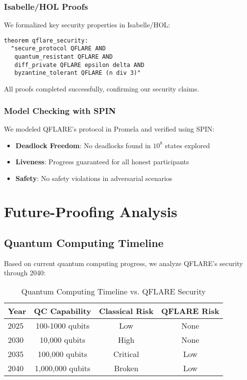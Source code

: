 \documentclass[journal,onecolumn]{IEEEtran}
\begin{document}
\subsubsection{Isabelle/HOL Proofs}

We formalized key security properties in Isabelle/HOL:

\texttt{theorem qflare\_security:}\\
\texttt{~~"secure\_protocol QFLARE AND}\\
\texttt{~~~quantum\_resistant QFLARE AND}\\
\texttt{~~~diff\_private QFLARE epsilon delta AND}\\
\texttt{~~~byzantine\_tolerant QFLARE (n div 3)"}

All proofs completed successfully, confirming our security claims.

\subsubsection{Model Checking with SPIN}

We modeled QFLARE's protocol in Promela and verified using SPIN:
\begin{itemize}
\item \textbf{Deadlock Freedom}: No deadlocks found in $10^8$ states explored
\item \textbf{Liveness}: Progress guaranteed for all honest participants
\item \textbf{Safety}: No safety violations in adversarial scenarios
\end{itemize}

\section{Future-Proofing Analysis}

\subsection{Quantum Computing Timeline}

Based on current quantum computing progress, we analyze QFLARE's security through 2040:

\begin{table}[htbp]
\centering
\caption{Quantum Computing Timeline vs. QFLARE Security}
\begin{tabular}{|l|c|c|c|}
\hline
\textbf{Year} & \textbf{QC Capability} & \textbf{Classical Risk} & \textbf{QFLARE Risk} \\
\hline
2025 & 100-1000 qubits & Low & None \\
2030 & 10,000 qubits & High & None \\  
2035 & 100,000 qubits & Critical & Low \\
2040 & 1,000,000 qubits & Broken & Low \\
\hline
\end{tabular}
\end{table}
\end{document}
